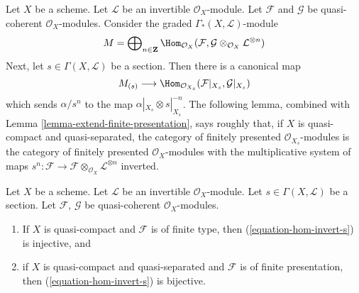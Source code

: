 \noindent
Let $X$ be a scheme. Let $\mathcal{L}$ be an invertible $\mathcal{O}_X$-module.
Let $\mathcal{F}$ and $\mathcal{G}$ be quasi-coherent $\mathcal{O}_X$-modules.
Consider the graded $\Gamma_*(X, \mathcal{L})$-module
$$
M = \bigoplus\nolimits_{n \in \mathbf{Z}} \Hom_{\mathcal{O}_X}(\mathcal{F},
\mathcal{G} \otimes_{\mathcal{O}_X} \mathcal{L}^{\otimes n})
$$
Next, let $s \in \Gamma(X, \mathcal{L})$ be a section. Then there is a
canonical map
\begin{equation}
\label{equation-hom-invert-s}
M_{(s)} \longrightarrow
\Hom_{\mathcal{O}_{X_s}}(\mathcal{F}|_{X_s}, \mathcal{G}|_{X_s})
\end{equation}
which sends $\alpha/s^n$ to the map $\alpha|_{X_s} \otimes s|_{X_s}^{-n}$.
The following lemma, combined with
Lemma \ref{lemma-extend-finite-presentation},
says roughly that, if $X$ is quasi-compact and quasi-separated,
the category of finitely presented $\mathcal{O}_{X_s}$-modules
is the category of finitely presented $\mathcal{O}_X$-modules
with the multiplicative system of maps
$s^n: \mathcal{F} \to
\mathcal{F} \otimes_{\mathcal{O}_X} \mathcal{L}^{\otimes n}$ inverted.

\begin{lemma}
\label{lemma-section-maps-backwards}
Let $X$ be a scheme. Let $\mathcal{L}$ be an invertible $\mathcal{O}_X$-module.
Let $s \in \Gamma(X, \mathcal{L})$ be a section.
Let $\mathcal{F}$, $\mathcal{G}$ be quasi-coherent $\mathcal{O}_X$-modules.
\begin{enumerate}
\item If $X$ is quasi-compact and $\mathcal{F}$ is of finite type,
then (\ref{equation-hom-invert-s}) is injective, and
\item if $X$ is quasi-compact and quasi-separated and $\mathcal{F}$
is of finite presentation, then
(\ref{equation-hom-invert-s})
is bijective.
\end{enumerate}
\end{lemma}


